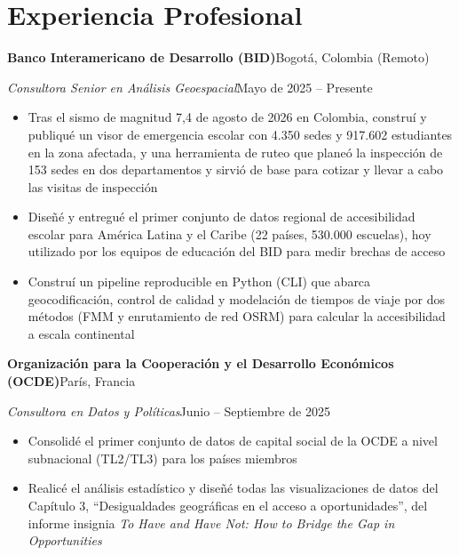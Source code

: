 \documentclass[10pt]{article}
\newcommand{\org}[2]{\noindent\textbf{#1}\hfill #2\par\vspace{0pt}}
\newcommand{\role}[2]{\noindent\textit{#1}\hfill #2\par\vspace{0pt}}
\newenvironment{cvitems}{%
  \begin{itemize}[
    leftmargin=1.2em,
    itemsep=0pt,
    parsep=0pt,
    topsep=1pt,
    label={$\bullet$}]%
}{\end{itemize}}
\newcommand{\entrygap}{\vspace{6pt}}
\begin{document}
\section{Experiencia Profesional}

\org{Banco Interamericano de Desarrollo (BID)}{Bogot\'a, Colombia (Remoto)}
\role{Consultora Senior en An\'alisis Geoespacial}{Mayo de 2025 -- Presente}
\vspace{-1pt}
\begin{cvitems}
  \item Tras el sismo de magnitud 7,4 de agosto de 2026 en Colombia, constru\'i y publiqu\'e un visor de emergencia escolar con 4.350 sedes y 917.602 estudiantes en la zona afectada, y una herramienta de ruteo que plane\'o la inspecci\'on de 153 sedes en dos departamentos y sirvi\'o de base para cotizar y llevar a cabo las visitas de inspecci\'on
  \item Dise\~n\'e y entregu\'e el primer conjunto de datos regional de accesibilidad escolar para Am\'erica Latina y el Caribe (22 pa\'ises, 530.000 escuelas), hoy utilizado por los equipos de educaci\'on del BID para medir brechas de acceso
  \item Constru\'i un pipeline reproducible en Python (CLI) que abarca geocodificaci\'on, control de calidad y modelaci\'on de tiempos de viaje por dos m\'etodos (FMM y enrutamiento de red OSRM) para calcular la accesibilidad a escala continental
\end{cvitems}

\entrygap
\org{Organizaci\'on para la Cooperaci\'on y el Desarrollo Econ\'omicos (OCDE)}{Par\'is, Francia}
\role{Consultora en Datos y Pol\'iticas}{Junio -- Septiembre de 2025}
\vspace{-1pt}
\begin{cvitems}
  \item Consolid\'e el primer conjunto de datos de capital social de la OCDE a nivel subnacional (TL2/TL3) para los pa\'ises miembros
  \item Realic\'e el an\'alisis estad\'istico y dise\~n\'e todas las visualizaciones de datos del Cap\'itulo 3, ``Desigualdades geogr\'aficas en el acceso a oportunidades'', del informe insignia \textit{To Have and Have Not: How to Bridge the Gap in Opportunities}
\end{cvitems}
\end{document}
